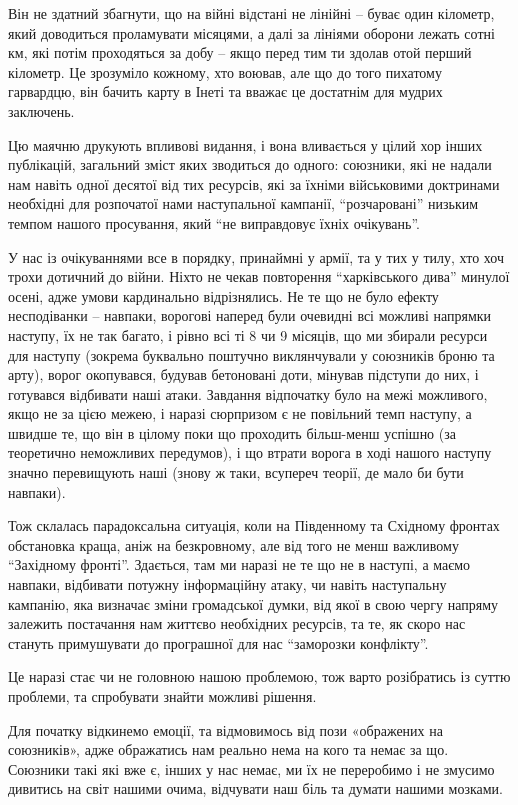 Він не здатний збагнути, що на війні відстані не лінійні – буває один кілометр,
який доводиться проламувати місяцями, а далі за лініями оборони лежать сотні
км, які потім проходяться за добу – якщо перед тим ти здолав отой перший
кілометр. Це зрозуміло кожному, хто воював, але що до того пихатому гарвардцю,
він бачить карту в Інеті та вважає це достатнім для мудрих заключень.

Цю маячню друкують впливові видання, і вона вливається у цілий хор інших
публікацій, загальний зміст яких зводиться до одного: союзники, які не надали
нам навіть одної десятої від тих ресурсів, які за їхніми військовими доктринами
необхідні для розпочатої нами наступальної кампанії, \enquote{розчаровані} низьким
темпом нашого просування, який \enquote{не виправдовує їхніх очікувань}.

У нас із очікуваннями все в порядку, принаймні у армії, та у тих у тилу, хто
хоч трохи дотичний до війни. Ніхто не чекав повторення \enquote{харківського дива}
минулої осені, адже умови кардинально відрізнялись. Не те що не було ефекту
несподіванки – навпаки, ворогові наперед були очевидні всі можливі напрямки
наступу, їх не так багато, і рівно всі ті 8 чи 9 місяців, що ми збирали ресурси
для наступу (зокрема буквально поштучно виклянчували у союзників броню та
арту), ворог окопувався, будував бетоновані доти, мінував підступи до них, і
готувався відбивати наші атаки. Завдання відпочатку було на межі можливого,
якщо не за цією межею, і наразі сюрпризом є не повільний темп наступу, а швидше
те, що він в цілому поки що проходить більш-менш успішно (за теоретично
неможливих передумов), і що втрати ворога в ході нашого наступу значно
перевищують наші (знову ж таки, всупереч теорії, де мало би бути навпаки).

Тож склалась парадоксальна ситуація, коли на Південному та Східному фронтах
обстановка краща, аніж на безкровному, але від того не менш важливому
\enquote{Західному фронті}. Здається, там ми наразі не те що не в наступі, а маємо
навпаки, відбивати потужну інформаційну атаку, чи навіть наступальну кампанію,
яка визначає зміни громадської думки, від якої в свою чергу напряму залежить
постачання нам життєво необхідних ресурсів, та те, як скоро нас стануть
примушувати до програшної для нас \enquote{заморозки конфлікту}.

Це наразі стає чи не головною нашою проблемою, тож варто розібратись із суттю
проблеми, та спробувати знайти можливі рішення.

Для початку відкинемо емоції, та відмовимось від пози «ображених на союзників»,
адже ображатись нам реально нема на кого та немає за що. Союзники такі які вже
є, інших у нас немає, ми їх не переробимо і не змусимо дивитись на світ нашими
очима, відчувати наш біль та думати нашими мозками.


